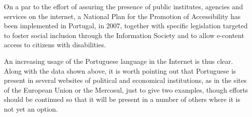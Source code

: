 \documentclass[]{../metanetpaper}
\begin{document}
\begin{multicols}{2}

On a par to the effort of assuring the presence of public institutes, agencies and services on the internet, a National Plan for the Promotion of Accessibility has been implemented in Portugal, in 2007, together with specific legislation\cite{umic} targeted to foster social inclusion through the Information Society and to allow e-content access to citizens with disabilities.

An increasing usage of the Portuguese language in the Internet is thus clear. Along with the data shown above, it is worth pointing out that Portuguese is present in several websites of political and economical institutions, as in the sites of the European Union or the Mercosul, just to give two examples, though efforts should be continued so that it will be present in a number of others where it is not yet an option.
\end{multicols}

\clearpage

\end{document}

